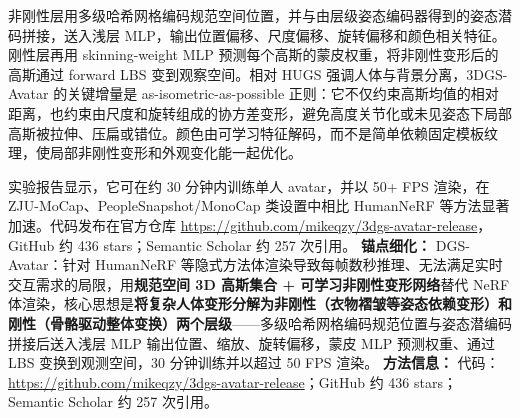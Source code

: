 非刚性层用多级哈希网格编码规范空间位置，并与由层级姿态编码器得到的姿态潜码拼接，送入浅层 MLP，输出位置偏移、尺度偏移、旋转偏移和颜色相关特征。刚性层再用 skinning-weight MLP 预测每个高斯的蒙皮权重，将非刚性变形后的高斯通过 forward LBS 变到观察空间。相对 HUGS 强调人体与背景分离，3DGS-Avatar 的关键增量是 as-isometric-as-possible 正则：它不仅约束高斯均值的相对距离，也约束由尺度和旋转组成的协方差变形，避免高度关节化或未见姿态下局部高斯被拉伸、压扁或错位。颜色由可学习特征解码，而不是简单依赖固定模板纹理，使局部非刚性变形和外观变化能一起优化。

实验报告显示，它可在约 30 分钟内训练单人 avatar，并以 50+ FPS 渲染，在 ZJU-MoCap、PeopleSnapshot/MonoCap 类设置中相比 HumanNeRF 等方法显著加速。代码发布在官方仓库 \url{https://github.com/mikeqzy/3dgs-avatar-release}，GitHub 约 436 stars；Semantic Scholar 约 257 次引用。
\textbf{锚点细化：} DGS-Avatar：针对 HumanNeRF 等隐式方法体渲染导致每帧数秒推理、无法满足实时交互需求的局限，用\textbf{规范空间 3D 高斯集合 + 可学习非刚性变形网络}替代 NeRF 体渲染，核心思想是\textbf{将复杂人体变形分解为非刚性（衣物褶皱等姿态依赖变形）和刚性（骨骼驱动整体变换）两个层级}——多级哈希网格编码规范位置与姿态潜编码拼接后送入浅层 MLP 输出位置、缩放、旋转偏移，蒙皮 MLP 预测权重、通过 LBS 变换到观测空间，30 分钟训练并以超过 50 FPS 渲染。
\textbf{方法信息：} 代码：\url{https://github.com/mikeqzy/3dgs-avatar-release}；GitHub 约 436 stars；Semantic Scholar 约 257 次引用。



